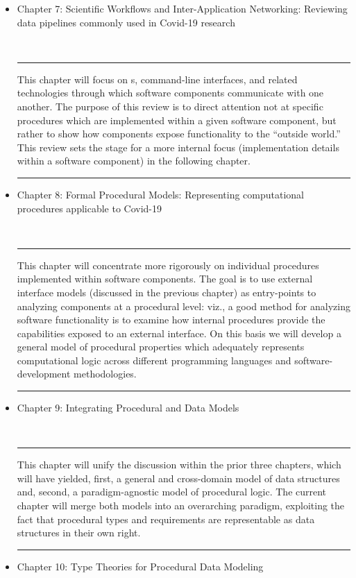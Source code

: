 \documentclass{statsoc}
\newcommand{\textscc}[1]{{\color{orr!35!black}{{%
						\fontfamily{Cabin-TLF}\fontseries{b}\selectfont{\textsc{\scriptsize{#1}}}}}}}
\newcommand{\AcronymText}[1]{{\textscc{#1}}}
\newcommand{\q}[1]{{\fontfamily{qcr}\selectfont ``}#1{\fontfamily{qcr}\selectfont ''}}
\newcommand{\API}{\resizebox{!}{7pt}{\AcronymText{API}}}
\newenvironment{summary}{\\\vspace{-4pt}%
%
%
\noindent\hfil\textcolor{rgrey!50!purple}{\rule{0.5\textwidth}{.4pt}}\hfil

\hspace{-2cm}\begin{minipage}{1.02\textwidth}\fontfamily{phv}\fontsize{9}{11}\selectfont}%
{\\\vspace{-1em}\end{minipage}
{\begin{center}\textcolor{rgrey!50!yellow}{\rule{0.5\textwidth}{.4pt}}\end{center}}
\vspace{2em}}%
\begin{document}
{\begin{description}
\begin{itemize}
\item Chapter 7: Scientific Workflows and Inter-Application Networking: 
Reviewing data pipelines commonly used in Covid-19 research

\begin{summary}
This chapter will focus on \API{}s, command-line interfaces, 
and related technologies through which software components 
communicate with one another.  The purpose of this review is 
to direct attention not at specific procedures which are 
implemented within a given software component, but rather 
to show how components expose functionality to the 
\q{outside world.}  This review sets the 
stage for a more internal focus (implementation 
details within a software component) in the following chapter. 
\end{summary}

\item Chapter 8: Formal Procedural Models: Representing 
computational procedures applicable to Covid-19

\begin{summary}
This chapter will concentrate more rigorously on individual 
procedures implemented within software components.  
The goal is to use external interface models (discussed 
in the previous chapter) as entry-points to analyzing 
components at a procedural level: viz., a good method for 
analyzing software functionality is to examine how 
internal procedures provide the capabilities exposed 
to an external interface.  On this basis we will 
develop a general model of procedural properties 
which adequately represents computational logic 
across different programming languages and 
software-development methodologies.   
\end{summary}

\item Chapter 9: Integrating Procedural and Data Models

\begin{summary}
This chapter will unify the discussion within the prior 
three chapters, which will have yielded, first, a 
general and cross-domain model of data structures and, 
second, a paradigm-agnostic model of procedural logic.  
The current chapter will merge both models into an 
overarching paradigm, exploiting the fact that 
procedural types and requirements are representable 
as data structures in their own right. 
\end{summary}

\item Chapter 10: Type Theories for Procedural Data Modeling


\end{itemize}
\end{description}}
\end{document}
